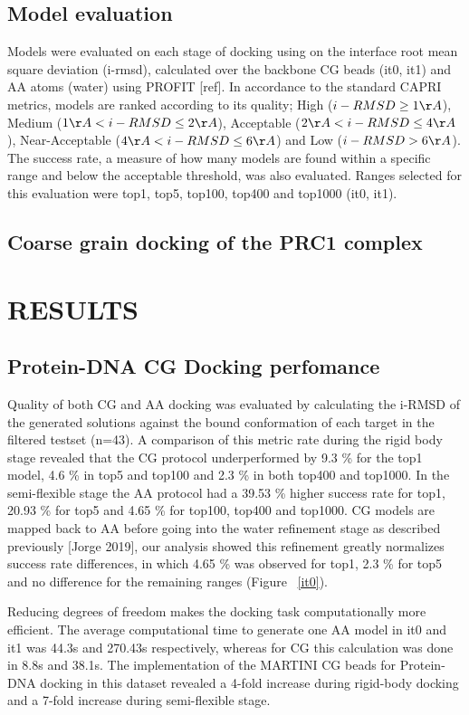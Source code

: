 \documentclass[a4,center,fleqn]{NAR}
\begin{document}
\subsection{Model evaluation}
Models were evaluated on each stage of docking using on the interface root mean square deviation (i-rmsd), calculated over the backbone CG beads (it0, it1) and AA atoms (water) using PROFIT [ref]. In accordance to the standard CAPRI metrics, models are ranked according to its quality; High ($i-RMSD \geq 1 \AA$), Medium ($1 \AA < i-RMSD \leq 2 \AA$), Acceptable ($2 \AA < i-RMSD \leq 4 \AA$), Near-Acceptable ($4 \AA < i-RMSD \leq 6 \AA$) and Low ($i-RMSD > 6 \AA$). The success rate, a measure of how many models are found within a specific range and below the acceptable threshold, was also evaluated. Ranges selected for this evaluation were top1, top5, top100, top400 and top1000 (it0, it1).

\subsection{Coarse grain docking of the PRC1 complex}

\section{RESULTS}

\subsection{Protein-DNA CG Docking perfomance}
Quality of both CG and AA docking was evaluated by calculating the i-RMSD of the generated solutions against the bound conformation of each target in the filtered testset (n=43). A comparison of this metric rate during the rigid body stage revealed that the CG protocol underperformed by 9.3 \% for the top1 model, 4.6 \% in top5 and top100 and 2.3 \% in both top400 and top1000. In the semi-flexible stage the AA protocol had a 39.53 \% higher success rate for top1, 20.93 \% for top5 and 4.65 \% for top100, top400 and top1000. %
CG models are mapped back to AA before going into the water refinement stage as described previously [Jorge 2019], our analysis showed this refinement greatly normalizes success rate differences, in which 4.65 \% was observed for top1, 2.3 \% for top5 and no difference for the remaining ranges (Figure ~\ref{it0}).

Reducing degrees of freedom makes the docking task computationally more efficient. The average computational time to generate one AA model in it0 and it1 was 44.3s and 270.43s respectively, whereas for CG this calculation was done in 8.8s and 38.1s. The implementation of the MARTINI CG beads for Protein-DNA docking in this dataset revealed a 4-fold increase during rigid-body docking and a 7-fold increase during semi-flexible stage. %
\end{document}
